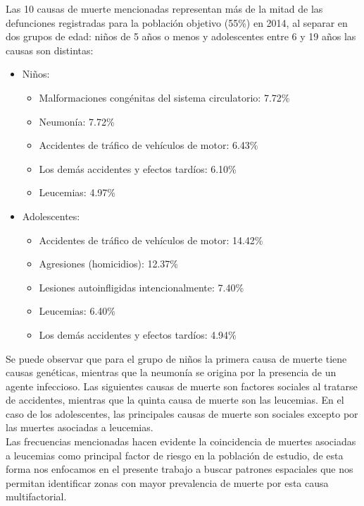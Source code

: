 \documentclass[11pt, oneside]{book}
\begin{document}
Las 10 causas de muerte mencionadas representan más de la mitad de las defunciones registradas para la población objetivo (55\%) en 2014, al separar en dos grupos de edad: niños de 5 años o menos y adolescentes entre 6 y 19 años las causas son distintas:

\begin{itemize}
	\item Niños:
\begin{itemize}
  \item Malformaciones congénitas del sistema circulatorio: 7.72\%
  \item Neumonía: 7.72\%
  \item Accidentes de tráfico de vehículos de motor: 6.43\%
  \item Los demás accidentes y efectos tardíos: 6.10\%
  \item Leucemias: 4.97\%
\end{itemize}
	\item Adolescentes:
\begin{itemize}
  \item Accidentes de tráfico de vehículos de motor: 14.42\%
  \item Agresiones (homicidios): 12.37\%
  \item Lesiones autoinfligidas intencionalmente: 7.40\%
  \item Leucemias: 6.40\%
  \item Los demás accidentes y efectos tardíos: 4.94\%

\end{itemize}
\end{itemize}

Se puede observar que para el grupo de niños la primera causa de muerte tiene causas genéticas, mientras que la neumonía se origina por la presencia de un agente infeccioso. Las siguientes causas de muerte son factores sociales al tratarse de accidentes, mientras que la quinta causa de muerte son las leucemias. En el caso de los adolescentes, las principales causas de muerte son sociales excepto por las muertes asociadas a leucemias.\\

Las frecuencias mencionadas hacen evidente la coincidencia de muertes asociadas a leucemias como principal factor de riesgo en la población de estudio, de esta forma nos enfocamos en el presente trabajo a buscar patrones espaciales que nos permitan identificar zonas con mayor prevalencia de muerte por esta causa multifactorial.\\
\end{document}
